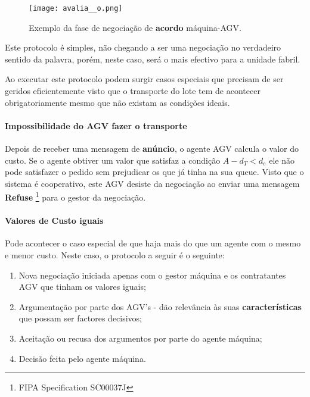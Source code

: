 \begin{titlepage}
\begin{figure}[H]
  \centering
    \texttt{[image: avalia\_\_o.png]}
  \caption{Exemplo da fase de negociação de \textbf{acordo} máquina-AGV.}
  \label{avaliacao}
\end{figure}

Este protocolo é simples, não chegando a ser uma negociação no verdadeiro sentido da palavra, porém, neste caso, será o mais efectivo para a unidade fabril. \newline

Ao executar este protocolo podem surgir casos especiais que precisam de ser geridos eficientemente visto que o transporte do lote tem de acontecer obrigatoriamente mesmo que não existam as condições ideais.

\paragraph{Impossibilidade do AGV fazer o transporte}

Depois de receber uma mensagem de \textbf{anúncio}, o agente AGV calcula o valor do custo. Se o agente obtiver um valor que satisfaz a condição $A-d_{T} < d_{e}$ ele não pode satisfazer o pedido sem prejudicar os que já tinha na sua queue. Visto que o sistema é cooperativo, este AGV desiste da negociação ao enviar uma mensagem \textbf{Refuse} \footnote{FIPA Specification SC00037J\cite{fipa}} para o gestor da negociação.

\paragraph{Valores de Custo iguais}\label{protocoloigual}

Pode acontecer o caso especial de que haja mais do que um agente com o mesmo e menor custo. Neste caso, o protocolo a seguir é o seguinte:

\begin{enumerate}
\item Nova negociação iniciada apenas com o gestor máquina e os contratantes AGV que tinham os valores iguais;
\item Argumentação por parte dos AGV's - dão relevância às suas \textbf{características} que possam ser factores decisivos;
\item Aceitação ou recusa dos argumentos por parte do agente máquina;
\item Decisão feita pelo agente máquina.
\end{enumerate}


\end{titlepage}
